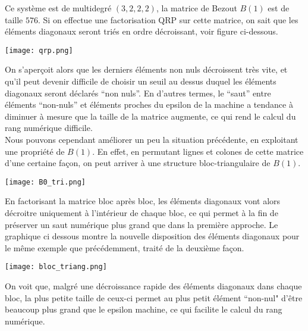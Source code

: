 \documentclass{standalone}
\begin{document}
  Ce système est de multidegré $(3, 2, 2, 2)$, la matrice de Bezout $B(1)$ est de taille $576$. Si on effectue une factorisation QRP sur cette matrice, on sait que les éléments diagonaux seront triés en ordre décroissant, voir figure ci-dessous.
  \begin{center}
  \texttt{[image: qrp.png]}
  \end{center}
   On s'aperçoit alors que les derniers éléments non nuls décroissent très vite, et qu'il peut devenir difficile de choisir un seuil au dessus duquel les éléments diagonaux seront déclarés ``non nuls''.
  En d'autres termes, le ``saut'' entre éléments ``non-nuls'' et éléments proches du epsilon de la machine a tendance à diminuer à mesure que la taille de la matrice augmente, ce qui rend le calcul du rang numérique difficile.\\
  Nous pouvons cependant améliorer un peu la situation précédente, en exploitant une propriété de $B(1)$. En effet, en permutant lignes et colones de cette matrice d'une certaine façon, on peut arriver à une structure bloc-triangulaire de $B(1)$.
  \begin{center}
  \texttt{[image: B0\_tri.png]}
  \end{center}
  En factorisant la matrice bloc après bloc, les éléments diagonaux vont alors décroitre uniquement à l'intérieur de chaque bloc, ce qui permet à la fin de préserver un saut numérique plus grand que dans la première approche. Le graphique ci dessous montre la nouvelle disposition des éléments diagonaux pour le même exemple que précédemment, traité de la deuxième façon.
  \begin{center}
  \texttt{[image: bloc\_triang.png]}
  \end{center}
  On voit que, malgré une décroissance rapide des éléments diagonaux dans chaque bloc, la plus petite taille de ceux-ci permet au plus petit élément ``non-nul" d'être beaucoup plus grand que le epsilon machine, ce qui facilite le calcul du rang numérique.
\end{document}
